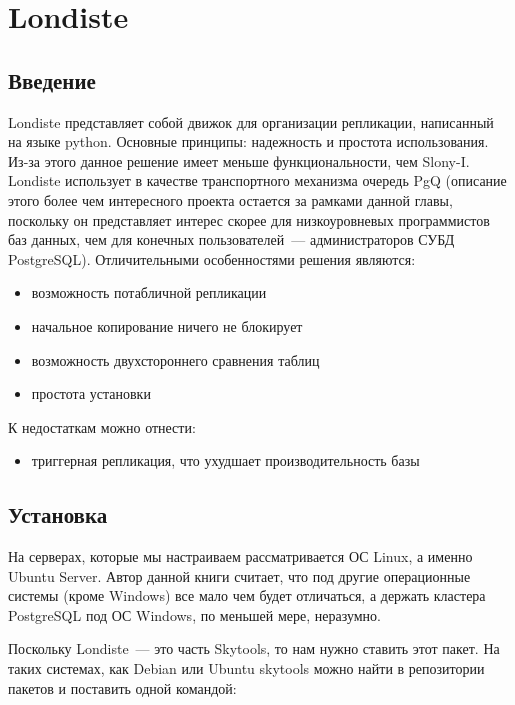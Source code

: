 \section{Londiste}
\label{sec:londiste}

\subsection{Введение}
Londiste представляет собой движок для организации репликации, написанный на языке python. Основные принципы: надежность и простота использования. Из-за этого данное решение имеет меньше функциональности, чем Slony-I. Londiste использует в качестве транспортного механизма очередь PgQ  (описание этого более чем интересного проекта остается за рамками данной главы, поскольку он представляет интерес скорее для низкоуровневых программистов баз данных, чем для конечных пользователей~--- администраторов СУБД PostgreSQL). Отличительными особенностями решения являются:

\begin{itemize}
  \item возможность потабличной репликации
  \item начальное копирование ничего не блокирует
  \item возможность двухстороннего сравнения таблиц
  \item простота установки
\end{itemize}

К недостаткам можно отнести:

\begin{itemize}
  \item триггерная репликация, что ухудшает производительность базы
\end{itemize}


\subsection{Установка}
На серверах, которые мы настраиваем рассматривается ОС Linux, а именно Ubuntu Server. Автор данной книги считает, что под другие операционные системы (кроме Windows) все мало чем будет отличаться, а держать кластера PostgreSQL под ОС Windows, по меньшей мере, неразумно.

Поскольку Londiste~--- это часть Skytools, то нам нужно ставить этот пакет. На таких системах, как Debian или Ubuntu skytools можно найти в репозитории пакетов и поставить одной командой:
\begin{lstlisting}[label=lst:londiste1,caption=Установка]
% sudo aptitude install skytools
\end{lstlisting}

